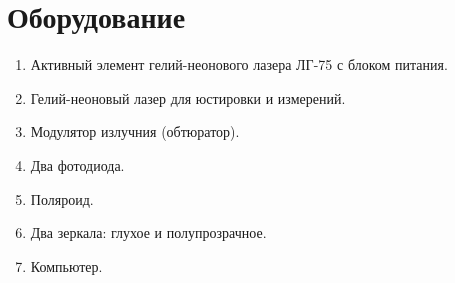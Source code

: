 \section*{Оборудование}

\begin{enumerate}
	\item Активный элемент гелий-неонового лазера ЛГ-75 с блоком питания.

	\item Гелий-неоновый лазер для юстировки и измерений.

	\item Модулятор излучния (обтюратор).

	\item Два фотодиода.

	\item Поляроид.

	\item Два зеркала: глухое и полупрозрачное.

	\item Компьютер.
\end{enumerate}